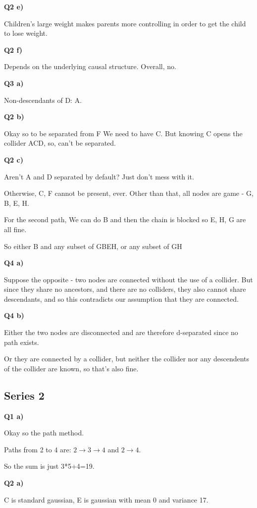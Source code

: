 \documentclass{article}
\begin{document}
		\textbf{Q2 e)}
		
			Children's large weight makes parents more controlling in order to get the child to lose weight.
			
		\textbf{Q2 f)}
		
			Depends on the underlying causal structure. Overall, no. 
			
		\textbf{Q3 a)}
			
			Non-descendants of D: A.
			
		\textbf{Q2 b)}

			Okay so to be separated from F We need to have C.  But knowing C opens the collider ACD, so, can't be separated.
			
		\textbf{Q2 c)}
				
			Aren't A and D separated by default?  Just don't mess with it.
			
			Otherwise, C, F cannot be present, ever. Other than that, all nodes are game - G, B, E, H.
			
			For the second  path, We can do B and then the chain is blocked so E, H, G are all fine.
			
			So either B and any subset of GBEH, or any subset of GH
			
		\textbf{Q4 a)}
		
			Suppose the opposite - two nodes are connected without the use of a collider. But since they share no ancestors, and there are no colliders, they also cannot share descendants, and so this contradicts our assumption that they are connected.
			
		\textbf{Q4 b)}
		
			Either the two nodes are disconnected and are therefore d-separated since no path exists.
			
			Or they are connected by a collider, but neither the collider nor any descendents of the collider are known, so that's also fine.
			
	\subsection{Series 2}
	
		\textbf{Q1 a)}
		
			Okay so the path method.
			
			Paths from 2 to 4 are: $2\to3\to4$ and $2\to 4$. 
			
			So the sum is just 3*5+4=19.
			
		\textbf{Q2 a)}
		
			C is standard gaussian, E is gaussian with mean 0 and variance 17.
			
\end{document}
